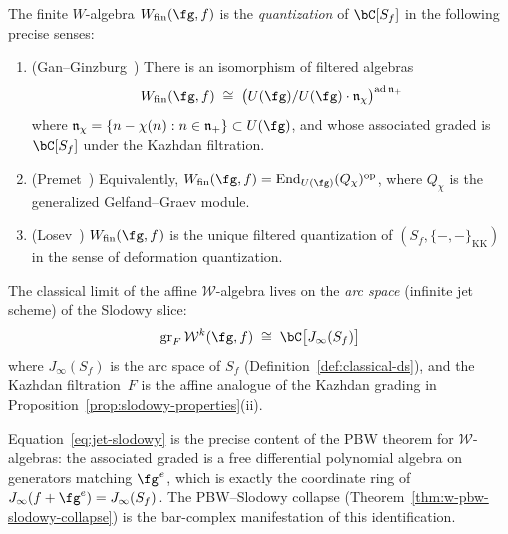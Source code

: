 \begin{theorem}
\label{thm:slodowy-quantization}
The finite $W$-algebra $W_{\mathrm{fin}}(\fg, f)$ is the
\emph{quantization} of $\bC[S_f]$ in the following precise senses:
\begin{enumerate}[label=\textup{(\roman*)}]
\item \textup{(}Gan--Ginzburg~\textup{\cite{GanGinzburg02}}\textup{)}
  There is an isomorphism of filtered algebras
  \begin{equation}\label{eq:gan-ginzburg}
  W_{\mathrm{fin}}(\fg, f) \;\cong\;
  \bigl(U(\fg) / U(\fg) \cdot \mathfrak{n}_\chi\bigr)^{\operatorname{ad}\mathfrak{n}_+}
  \end{equation}
  where $\mathfrak{n}_\chi = \{n - \chi(n) : n \in \mathfrak{n}_+\}
  \subset U(\fg)$, and whose associated graded is $\bC[S_f]$
  under the Kazhdan filtration.
\item \textup{(}Premet~\textup{\cite{Premet02}}\textup{)}
  Equivalently,
  $W_{\mathrm{fin}}(\fg, f) =
  \operatorname{End}_{U(\fg)}(Q_\chi)^{\mathrm{op}}$,
  where $Q_\chi$ is the generalized Gelfand--Graev module.
\item \textup{(}Losev~\textup{\cite{Losev10}}\textup{)}
  $W_{\mathrm{fin}}(\fg, f)$ is the unique filtered quantization
  of $(S_f, \{-,-\}_{\mathrm{KK}})$ in the sense of deformation
  quantization.
\end{enumerate}
\end{theorem}

\begin{remark}
\label{rem:jet-slodowy}
The classical limit of the affine $\mathcal{W}$-algebra lives on the
\emph{arc space} (infinite jet scheme) of the Slodowy slice:
\begin{equation}\label{eq:jet-slodowy}
\operatorname{gr}_F \mathcal{W}^k(\fg, f) \;\cong\;
\bC\bigl[J_\infty(S_f)\bigr]
\end{equation}
where $J_\infty(S_f)$ is the arc space of $S_f$
(Definition~\ref{def:classical-ds}), and the Kazhdan filtration~$F$
is the affine analogue of the Kazhdan grading in
Proposition~\ref{prop:slodowy-properties}(ii).

Equation~\eqref{eq:jet-slodowy} is the precise content of the
PBW theorem for $\mathcal{W}$-algebras: the associated graded is
a free differential polynomial algebra on generators matching
$\fg^e$, which is exactly the coordinate ring of
$J_\infty(f + \fg^e) = J_\infty(S_f)$.  The PBW--Slodowy collapse
(Theorem~\ref{thm:w-pbw-slodowy-collapse}) is the bar-complex
manifestation of this identification.
\end{remark}

